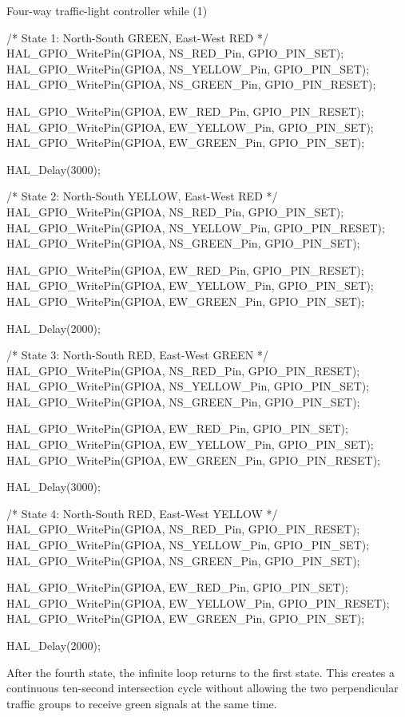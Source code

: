 \documentclass[a4paper]{article}
\begin{document}
\begin{stmcode}{Four-way traffic-light controller}
while (1)
{
    /* State 1: North-South GREEN, East-West RED */
    HAL_GPIO_WritePin(GPIOA, NS_RED_Pin,    GPIO_PIN_SET);
    HAL_GPIO_WritePin(GPIOA, NS_YELLOW_Pin, GPIO_PIN_SET);
    HAL_GPIO_WritePin(GPIOA, NS_GREEN_Pin,  GPIO_PIN_RESET);

    HAL_GPIO_WritePin(GPIOA, EW_RED_Pin,    GPIO_PIN_RESET);
    HAL_GPIO_WritePin(GPIOA, EW_YELLOW_Pin, GPIO_PIN_SET);
    HAL_GPIO_WritePin(GPIOA, EW_GREEN_Pin,  GPIO_PIN_SET);

    HAL_Delay(3000);

    /* State 2: North-South YELLOW, East-West RED */
    HAL_GPIO_WritePin(GPIOA, NS_RED_Pin,    GPIO_PIN_SET);
    HAL_GPIO_WritePin(GPIOA, NS_YELLOW_Pin, GPIO_PIN_RESET);
    HAL_GPIO_WritePin(GPIOA, NS_GREEN_Pin,  GPIO_PIN_SET);

    HAL_GPIO_WritePin(GPIOA, EW_RED_Pin,    GPIO_PIN_RESET);
    HAL_GPIO_WritePin(GPIOA, EW_YELLOW_Pin, GPIO_PIN_SET);
    HAL_GPIO_WritePin(GPIOA, EW_GREEN_Pin,  GPIO_PIN_SET);

    HAL_Delay(2000);

    /* State 3: North-South RED, East-West GREEN */
    HAL_GPIO_WritePin(GPIOA, NS_RED_Pin,    GPIO_PIN_RESET);
    HAL_GPIO_WritePin(GPIOA, NS_YELLOW_Pin, GPIO_PIN_SET);
    HAL_GPIO_WritePin(GPIOA, NS_GREEN_Pin,  GPIO_PIN_SET);

    HAL_GPIO_WritePin(GPIOA, EW_RED_Pin,    GPIO_PIN_SET);
    HAL_GPIO_WritePin(GPIOA, EW_YELLOW_Pin, GPIO_PIN_SET);
    HAL_GPIO_WritePin(GPIOA, EW_GREEN_Pin,  GPIO_PIN_RESET);

    HAL_Delay(3000);

    /* State 4: North-South RED, East-West YELLOW */
    HAL_GPIO_WritePin(GPIOA, NS_RED_Pin,    GPIO_PIN_RESET);
    HAL_GPIO_WritePin(GPIOA, NS_YELLOW_Pin, GPIO_PIN_SET);
    HAL_GPIO_WritePin(GPIOA, NS_GREEN_Pin,  GPIO_PIN_SET);

    HAL_GPIO_WritePin(GPIOA, EW_RED_Pin,    GPIO_PIN_SET);
    HAL_GPIO_WritePin(GPIOA, EW_YELLOW_Pin, GPIO_PIN_RESET);
    HAL_GPIO_WritePin(GPIOA, EW_GREEN_Pin,  GPIO_PIN_SET);

    HAL_Delay(2000);
}
\end{stmcode}

After the fourth state, the infinite loop returns to the first state. This
creates a continuous ten-second intersection cycle without allowing the two
perpendicular traffic groups to receive green signals at the same time.
\end{document}
